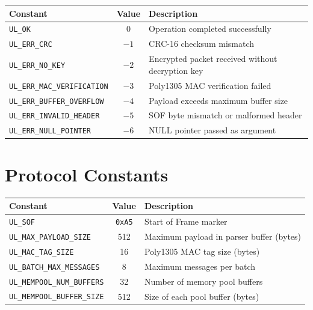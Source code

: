 \documentclass[11pt,a4paper]{article}
\begin{document}
\begin{table}[H]
\centering
\begin{tabular}{@{}lcl@{}}
\toprule
\textbf{Constant} & \textbf{Value} & \textbf{Description} \\
\midrule
\texttt{UL\_OK}                    &  0 & Operation completed successfully \\
\texttt{UL\_ERR\_CRC}              & $-1$ & CRC-16 checksum mismatch \\
\texttt{UL\_ERR\_NO\_KEY}          & $-2$ & Encrypted packet received without decryption key \\
\texttt{UL\_ERR\_MAC\_VERIFICATION} & $-3$ & Poly1305 MAC verification failed \\
\texttt{UL\_ERR\_BUFFER\_OVERFLOW} & $-4$ & Payload exceeds maximum buffer size \\
\texttt{UL\_ERR\_INVALID\_HEADER}  & $-5$ & SOF byte mismatch or malformed header \\
\texttt{UL\_ERR\_NULL\_POINTER}    & $-6$ & NULL pointer passed as argument \\
\bottomrule
\end{tabular}
\end{table}

\section{Protocol Constants}

\begin{table}[H]
\centering
\begin{tabular}{@{}lcl@{}}
\toprule
\textbf{Constant} & \textbf{Value} & \textbf{Description} \\
\midrule
\texttt{UL\_SOF}              & \texttt{0xA5} & Start of Frame marker \\
\texttt{UL\_MAX\_PAYLOAD\_SIZE} & 512          & Maximum payload in parser buffer (bytes) \\
\texttt{UL\_MAC\_TAG\_SIZE}    & 16            & Poly1305 MAC tag size (bytes) \\
\texttt{UL\_BATCH\_MAX\_MESSAGES} & 8          & Maximum messages per batch \\
\texttt{UL\_MEMPOOL\_NUM\_BUFFERS} & 32        & Number of memory pool buffers \\
\texttt{UL\_MEMPOOL\_BUFFER\_SIZE} & 512       & Size of each pool buffer (bytes) \\
\bottomrule
\end{tabular}
\end{table}
\end{document}
